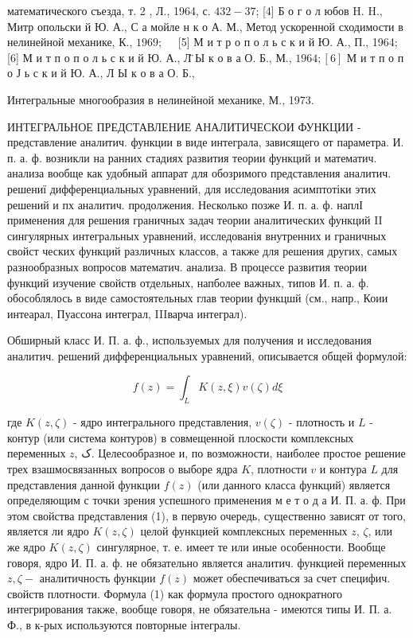 \documentclass[10pt]{article}
\begin{document}
математического съезда, т. 2 , Л., 1964, с. $432-37$; [4] Б о г о л юбов H. H., Митр опольски й Ю. А., С а мойле н к о А. М., Метод ускоренной сходимости в нелинейной механике, К., $1969 ; \quad$ [5] М и т р о п о л ь с к и й Ю. А., П., 1964; [6] М и т п о п о л ь с к и й Ю. А., Л̈ Ы к о в а О. Б., М., $1964 ;[6]$ М и т п о п о Ј ь с к и й Ю. А., Л Ы к о в а О. Б.,

Интегральные многообразия в нелинейной механике, М., 1973.



ИНТЕГРАЛЬНОЕ ПРЕДСТАВЛЕНИЕ АНАЛИТИЧЕСКОИ ФУНКЦИИ - представление аналитич. функции в виде интеграла, зависящего от параметра. И. п. а. ф. возникли на ранних стадиях развития теории функций и математич. анализа вообще как удобный аппарат для обозримого представления аналитич. решениї дифференциальных уравнений, для исследования асимптотіки этих решений и пх аналитич. продолжения. Несколько позже И. п. а. ф. наплІ применения для решения граничных задач теории аналитических функций II сингулярных интегральных уравнений, исследованія внутренних и граничных свойст ческих функций различных классов, а также для решения других, самых разнообразных вопросов математич. анализа. В процессе развития теории функций изучение свойств отдельных, напболее важных, типов И. п. а. ф. обособлялось в виде самостоятельных глав теории функцшй (см., напр., Коии интеарал, Пуассона интеграл, IIIварча интеграл).



Обширный класс И. П. а. ф., используемых для получения и исследования аналитич. решений дифференциальных уравнений, описывается общей формулой:



\[

f(z)=\int_{L} K(z, \xi) v(\zeta) d \xi

\]



где $K(z, \zeta)$ - ядро интегрального представления, $v(\zeta)$ - плотность и $L$ - контур (или система контуров) в совмещенной плоскости комплексных переменных $z$, ک. Целесообразное и, по возможности, наиболее простое решение трех взашмосвязанных вопросов о выборе ядра $K$, плотности $v$ и контура $L$ для представления данной функции $f(z)$ (или данного класса функций) является определяющим с точки зрения успешного применения м е т о д а И. П. а. ф. При этом свойства представления (1), в первую очередь, существенно зависят от того, является ли ядро $K(z, \zeta)$ целой функцией комплексных переменных $z$, $\zeta$, или же ядро $K(z, \zeta)$ сингулярное, т. е. имеет те или иные особенности. Вообще говоря, ядро И. П. а. ф. не обязательно является аналитич. функцией переменных $z, \zeta-$ аналитичность функции $f(z)$ может обеспечиваться за счет специфич. свойств плотности. Формула (1) как формула простого однократного интегрирования также, вообще говоря, не обязательна - имеются типы И. П. а. Ф., в к-рых используются повторные інтегралы.
\end{document}
